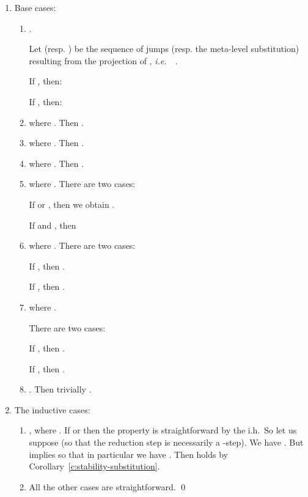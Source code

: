 \documentclass{LMCS}
\newcommand{\ie}{{\it  i.e.}~}
\renewcommand{\>}{\rightarrow}
\newcommand{\ih}{i.h.}
\newcommand{\ignore}[1]{}
\begin{document}
\proof \hfill
\begin{enumerate}[]
\item Base cases:
\begin{enumerate}[]
\item .

Let  (resp. ) be the sequence of jumps
(resp. the meta-level substitution) resulting from the 
projection of , \ie\ .

If , then:
 

 

If , then: 
 

\item   where  .  
Then . 
\item    where  .
Then .
\item    where 
. Then 
. 
\item   where  .
There are two cases:  

If  or , then we obtain .

If  and , then 
  


\item    
where .
There are two  cases:

If , then .

If , then .

\item    where 
.

There are two cases:

If , then 
. 

If  , then 
.



\item . Then trivially  .


\end{enumerate}

\item The inductive cases:  

\begin{enumerate}[]
\item ,
  where . If  or  then the
  property is straightforward by the \ih\ So let us suppose  (so that the reduction step is
  necessarily a -step). We have . But  
  implies 
  so that in particular we have  .
Then  holds by Corollary~\ref{c:stability-substitution}.


\ignore{
\item If  is an abstraction or an application the property is straightforward
      by the \ih\
\item , 
      where ,
      then the property is also straightforward
      by the \ih\
}
 \item All the other cases are straightforward. 
\qed
\end{enumerate}
\end{enumerate}
\end{document}
